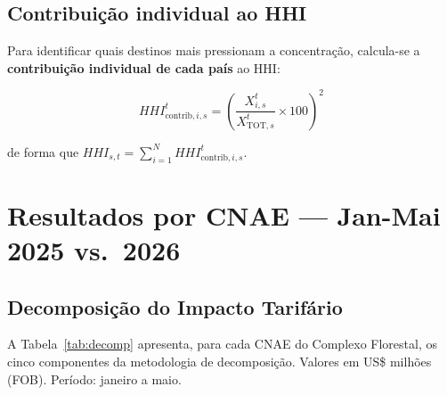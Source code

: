 \documentclass[12pt, a4paper]{article}
\begin{document}
\subsection{Contribuição individual ao HHI}

Para identificar quais destinos mais pressionam a concentração,
calcula-se a \textbf{contribuição individual de cada país} ao HHI:

\begin{equation}
  HHI_{\text{contrib},i,s}^{t}
    = \left(\frac{X_{i,s}^{t}}{X_{\text{TOT},s}^{t}} \times 100\right)^{2}
  \label{eq:hhi_contrib}
\end{equation}

de forma que $\displaystyle HHI_{s,t} = \sum_{i=1}^{N} HHI_{\text{contrib},i,s}^{t}$.

\section{Resultados por CNAE — Jan-Mai 2025 vs.\ 2026}
\label{sec:resultados}

\subsection{Decomposição do Impacto Tarifário}

A Tabela~\ref{tab:decomp} apresenta, para cada CNAE do Complexo Florestal,
os cinco componentes da metodologia de decomposição.
Valores em US\$ milhões (FOB). Período: janeiro a maio.
\end{document}
